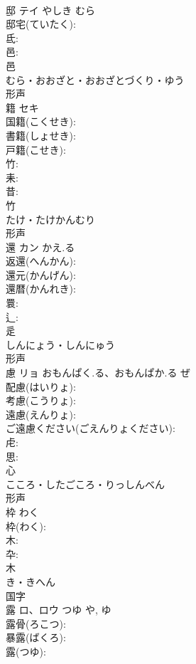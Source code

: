 \documentclass[8pt]{extreport}
\begin{document}
\begin{CJK}{UTF8}{min}
\\	邸	テイ	やしき	むら	
\\	邸宅(ていたく): 
\\	氐: 
\\	邑: 
\\	邑	
\\	むら・おおざと・おおざとづくり・ゆう	
\\	形声 
\\	籍	セキ			
\\	国籍(こくせき): 
\\	書籍(しょせき): 
\\	戸籍(こせき): 
\\	竹: 
\\	耒: 
\\	昔: 
\\	竹	
\\	たけ・たけかんむり	
\\	形声 
\\	還	カン	かえ.る		
\\	返還(へんかん): 
\\	還元(かんげん): 
\\	還暦(かんれき): 
\\	睘: 
\\	辶: 
\\	辵	
\\	しんにょう・しんにゅう	
\\	形声 
\\	慮	リョ	おもんぱく.る、おもんぱか.る	ぜ	
\\	配慮(はいりょ): 
\\	考慮(こうりょ): 
\\	遠慮(えんりょ): 
\\	ご遠慮ください(ごえんりょください): 
\\	虍: 
\\	思: 
\\	心	
\\	こころ・したごころ・りっしんべん	
\\	形声 
\\	枠		わく		
\\	枠(わく): 
\\	木: 
\\	卆: 
\\	木	
\\	き・きへん	
\\	国字 
\\	露	ロ、ロウ	つゆ	や, ゆ	
\\	露骨(ろこつ): 
\\	暴露(ばくろ): 
\\	露(つゆ): 

\end{CJK}
\end{document}
